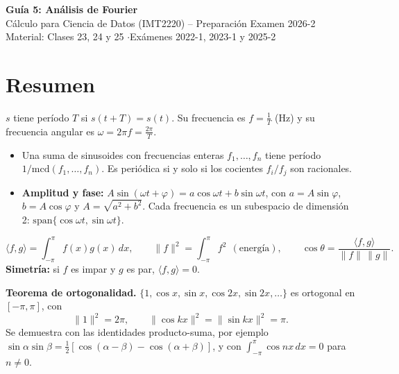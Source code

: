 \documentclass[11pt,a4paper]{article}
\begin{document}
\begin{center}
{\LARGE\bfseries Guía 5: Análisis de Fourier}\\[6pt]
{\large Cálculo para Ciencia de Datos (IMT2220) -- Preparación Examen 2026-2}\\[3pt]
{\small Material: Clases 23, 24 y 25 \quad$\cdot$\quad Exámenes 2022-1, 2023-1 y 2025-2}
\end{center}

\section{Resumen}

\begin{resumen}
$s$ tiene período $T$ si $s(t+T)=s(t)$. Su frecuencia es $f=\frac1T$ (Hz) y su frecuencia angular es $\omega=2\pi f=\frac{2\pi}T$.
\begin{itemize}[leftmargin=*,itemsep=1pt]
\item Una suma de sinusoides con frecuencias enteras $f_1,\dots,f_n$ tiene período $1/\mathrm{mcd}(f_1,\dots,f_n)$. Es periódica si y solo si los cocientes $f_i/f_j$ son racionales.
\item \textbf{Amplitud y fase:} $A\sin(\omega t+\varphi)=a\cos\omega t+b\sin\omega t$, con $a=A\sin\varphi$, $b=A\cos\varphi$ y $A=\sqrt{a^2+b^2}$. Cada frecuencia es un subespacio de dimensión 2: $\mathrm{span}\{\cos\omega t,\sin\omega t\}$.
\end{itemize}
\end{resumen}

\begin{resumen}
\[
\langle f,g\rangle=\int_{-\pi}^{\pi}f(x)g(x)\,dx,\qquad \|f\|^2=\int_{-\pi}^\pi f^2\ \ (\text{energía}),\qquad \cos\theta=\frac{\langle f,g\rangle}{\|f\|\,\|g\|}.
\]
\textbf{Simetría:} si $f$ es impar y $g$ es par, $\langle f,g\rangle=0$.

\textbf{Teorema de ortogonalidad.} $\{1,\cos x,\sin x,\cos2x,\sin2x,\dots\}$ es ortogonal en $[-\pi,\pi]$, con
\[
\|1\|^2=2\pi,\qquad\|\cos kx\|^2=\|\sin kx\|^2=\pi .
\]
Se demuestra con las identidades producto-suma, por ejemplo $\sin\alpha\sin\beta=\frac12[\cos(\alpha-\beta)-\cos(\alpha+\beta)]$, y con $\int_{-\pi}^\pi\cos nx\,dx=0$ para $n\neq0$.
\end{resumen}
\end{document}
